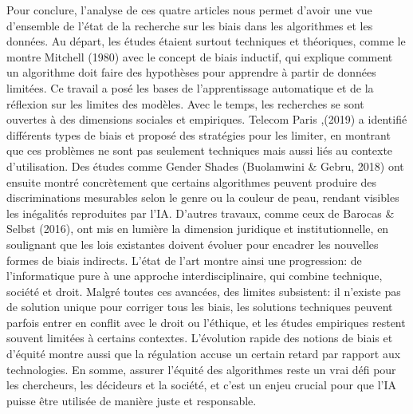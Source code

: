 \documentclass{article}
\begin{document}
Pour conclure, l’analyse de ces quatre articles nous permet d’avoir une vue d’ensemble de l’état de la recherche sur les biais dans les algorithmes et les données. Au départ, les études étaient surtout techniques et théoriques, comme le montre Mitchell (1980) avec le concept de biais inductif, qui explique comment un algorithme doit faire des hypothèses pour apprendre à partir de données limitées. Ce travail a posé les bases de l’apprentissage automatique et de la réflexion sur les limites des modèles. Avec le temps, les recherches se sont ouvertes à des dimensions sociales et empiriques. Telecom Paris ,(2019) a identifié différents types de biais et proposé des stratégies pour les limiter, en montrant que ces problèmes ne sont pas seulement techniques mais aussi liés au contexte d’utilisation. Des études comme Gender Shades (Buolamwini \& Gebru, 2018) ont ensuite montré concrètement que certains algorithmes peuvent produire des discriminations mesurables selon le genre ou la couleur de peau, rendant visibles les inégalités reproduites par l’IA. D’autres travaux, comme ceux de Barocas \& Selbst (2016), ont mis en lumière la dimension juridique et institutionnelle, en soulignant que les lois existantes doivent évoluer pour encadrer les nouvelles formes de biais indirects. L’état de l’art montre ainsi une progression: de l’informatique pure à une approche interdisciplinaire, qui combine technique, société et droit.	Malgré toutes ces avancées, des limites subsistent: il n’existe pas de solution unique pour corriger tous les biais, les solutions techniques peuvent parfois entrer en conflit avec le droit ou l’éthique, et les études empiriques restent souvent limitées à certains contextes. L’évolution rapide des notions de biais et d’équité montre aussi que la régulation accuse un certain retard par rapport aux technologies.	En somme, assurer l’équité des algorithmes reste un vrai défi pour les chercheurs, les décideurs et la société, et c’est un enjeu crucial pour que l’IA puisse être utilisée de manière juste et responsable.\\[1em]








\nocite{*}


\end{document}
